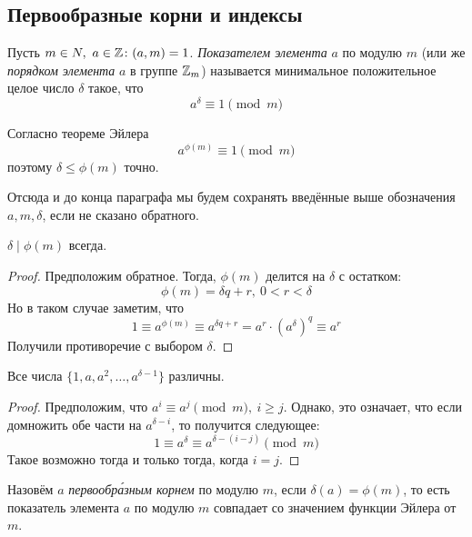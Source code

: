 \subsection{Первообразные корни и индексы}

\begin{definition}
	Пусть $m \in N,\ a \in \mathbb{Z} \colon (a, m) = 1$. \textit{Показателем элемента} $a$ по модулю $m$ (или же \textit{порядком элемента} $a$ в группе $\mathbb{Z}_m$) называется минимальное положительное целое число $\delta$ такое, что
	\[
		a^{\delta} \equiv 1 \pmod m
	\]
\end{definition}

\begin{note}
	Согласно теореме Эйлера
	\[
		a^{\phi(m)} \equiv 1 \pmod m
	\]
	поэтому $\delta \le \phi(m)$ точно.
\end{note}

\begin{note}
	Отсюда и до конца параграфа мы будем сохранять введённые выше обозначения $a, m, \delta$, если не сказано обратного.
\end{note}

\begin{proposition}
	$\delta \mid \phi(m)$ всегда.
\end{proposition}

\begin{proof}
	Предположим обратное. Тогда, $\phi(m)$ делится на $\delta$ с остатком:
	\[
		\phi(m) = \delta q + r,\ 0 < r < \delta
	\]
	Но в таком случае заметим, что
	\[
		1 \equiv a^{\phi(m)} \equiv a^{\delta q + r} = a^r \cdot (a^{\delta})^q \equiv a^r
	\]
	Получили противоречие с выбором $\delta$.
\end{proof}

\begin{proposition}
	Все числа $\{1, a, a^2, \ldots, a^{\delta - 1}\}$ различны.
\end{proposition}

\begin{proof}
	Предположим, что $a^{i} \equiv a^j \pmod m,\ i \ge j$. Однако, это означает, что если домножить обе части на $a^{\delta - i}$, то получится следующее:
	\[
		1 \equiv a^\delta \equiv a^{\delta - (i - j)} \pmod m
	\]
	Такое возможно тогда и только тогда, когда $i = j$.
\end{proof}

\begin{definition}
	Назовём $a$ \textit{первообр\'{а}зным корнем} по модулю $m$, если $\delta(a) = \phi(m)$, то есть показатель элемента $a$ по модулю $m$ совпадает со значением функции Эйлера от $m$.
\end{definition}

